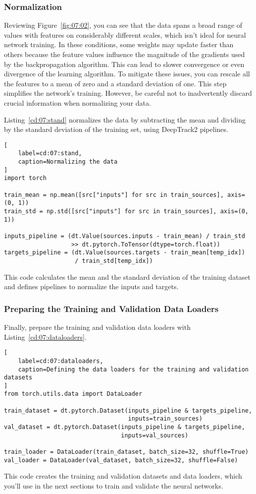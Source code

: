 \subsubsection{Normalization}

Reviewing Figure~\ref{fig:07:02}, you can see that the data spans a broad range of values with features on considerably different scales, which isn't ideal for neural network training. 
In these conditions, some weights may update faster than others because the feature values influence the magnitude of the gradients used by the backpropagation algorithm. This can lead to slower convergence or even divergence of the learning algorithm. To mitigate these issues, you can rescale all the features to a mean of zero and a standard deviation of one. This step simplifies the network's training. However, be careful not to inadvertently discard crucial information when normalizing your data. 

Listing~\ref{cd:07:stand} normalizes the data by subtracting the mean and dividing by the standard deviation of the training set, using DeepTrack2 pipelines. 
\begin{lstlisting}[
    label=cd:07:stand,
    caption=Normalizing the data
]
import torch

train_mean = np.mean([src["inputs"] for src in train_sources], axis=(0, 1))
train_std = np.std([src["inputs"] for src in train_sources], axis=(0, 1))

inputs_pipeline = (dt.Value(sources.inputs - train_mean) / train_std 
                   >> dt.pytorch.ToTensor(dtype=torch.float))
targets_pipeline = (dt.Value(sources.targets - train_mean[temp_idx]) 
                    / train_std[temp_idx])
\end{lstlisting}
This code calculates the mean and the standard deviation of the training dataset and defines pipelines to normalize the inputs and targets.

\subsubsection{Preparing the Training and Validation Data Loaders}

Finally, prepare the training and validation data loaders with Listing~\ref{cd:07:dataloaders}.
\begin{lstlisting}[
    label=cd:07:dataloaders,
    caption=Defining the data loaders for the training and validation datasets
]
from torch.utils.data import DataLoader

train_dataset = dt.pytorch.Dataset(inputs_pipeline & targets_pipeline, 
                                   inputs=train_sources)
val_dataset = dt.pytorch.Dataset(inputs_pipeline & targets_pipeline, 
                                 inputs=val_sources)

train_loader = DataLoader(train_dataset, batch_size=32, shuffle=True)
val_loader = DataLoader(val_dataset, batch_size=32, shuffle=False)
\end{lstlisting}
This code creates the training and validation datasets and data loaders, which you'll use in the next sections to train and validate the neural networks.

